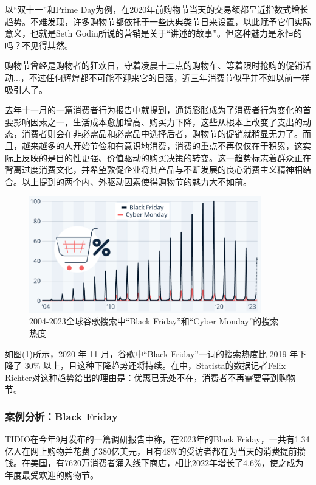 \documentclass[12pt]{ctexart}
\begin{document}
以“双十一”和Prime Day为例，在2020年前购物节当天的交易额都呈近指数式增长趋势。不难发现，许多购物节都依托于一些庆典类节日来设置，以此赋予它们实际意义，也就是Seth Godin所说的营销是关于“讲述的故事”。但这种魅力是永恒的吗？不见得其然。

购物节曾经是购物者的狂欢日，守着凌晨十二点的购物车、等着限时抢购的促销活动...，不过任何辉煌都不可能不迎来它的日落，近三年消费节似乎并不如以前一样吸引人了。

去年十一月的一篇消费者行为报告中就提到，通货膨胀成为了消费者行为变化的首要影响因素之一，生活成本愈加增高、购买力下降，这些从根本上改变了支出的动态，消费者则会在非必需品和必需品中选择后者，购物节的促销就稍显无力了。而且，越来越多的人开始节俭和有意识地消费，消费的重点不再仅仅在于积累，这实际上反映的是目的性更强、价值驱动的购买决策的转变。这一趋势标志着群众正在背离过度消费文化，并希望敦促企业将其产品与不断发展的良心消费主义精神相结合\cite{3}。以上提到的两个内、外驱动因素使得购物节的魅力大不如前。

\begin{figure}[htbp!]
    \centering
    \includegraphics[width=0.9\textwidth]{Images/3.png}
    \caption{2004-2023全球谷歌搜索中“Black Friday”和“Cyber Monday”的搜索热度\cite{4}}
    \label{bf-cm}
\end{figure}

如图(\ref{bf-cm})所示，2020 年 11 月，谷歌中“Black Friday”一词的搜索热度比 2019 年下降了 30\% 以上，且这种下降趋势还将持续。在\cite{4}中，Statista的数据记者Felix Richter对这种趋势给出的理由是：优惠已无处不在，消费者不再需要等到购物节。

\subsubsection{案例分析：Black Friday}
TIDIO在今年9月发布的一篇调研报告\cite{5}中称，在2023年的Black Friday，一共有1.34亿人在网上购物并花费了380亿美元，且有48\%的受访者都在为当天的消费提前攒钱。在美国，有7620万消费者涌入线下商店，相比2022年增长了4.6\%，使之成为年度最受欢迎的购物节。
\end{document}
